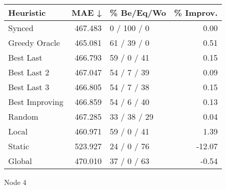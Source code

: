 \begin{tabular}{lrlr}
\toprule
\textbf{Heuristic} & \textbf{MAE ↓} & \textbf{\% Be/Eq/Wo} & \textbf{\% Improv.} \\
\midrule
            Synced &        467.483 &          0 / 100 / 0 &                0.00 \\
     Greedy Oracle &        465.081 &          61 / 39 / 0 &                0.51 \\
         Best Last &        466.793 &          59 / 0 / 41 &                0.15 \\
       Best Last 2 &        467.047 &          54 / 7 / 39 &                0.09 \\
       Best Last 3 &        466.805 &          54 / 7 / 38 &                0.15 \\
    Best Improving &        466.859 &          54 / 6 / 40 &                0.13 \\
            Random &        467.285 &         33 / 38 / 29 &                0.04 \\
             Local &        460.971 &          59 / 0 / 41 &                1.39 \\
            Static &        523.927 &          24 / 0 / 76 &              -12.07 \\
            Global &        470.010 &          37 / 0 / 63 &               -0.54 \\
\bottomrule
\end{tabular}
\caption{Node 4}
\label{tab:iid_lr01_le2_bs2_4}
